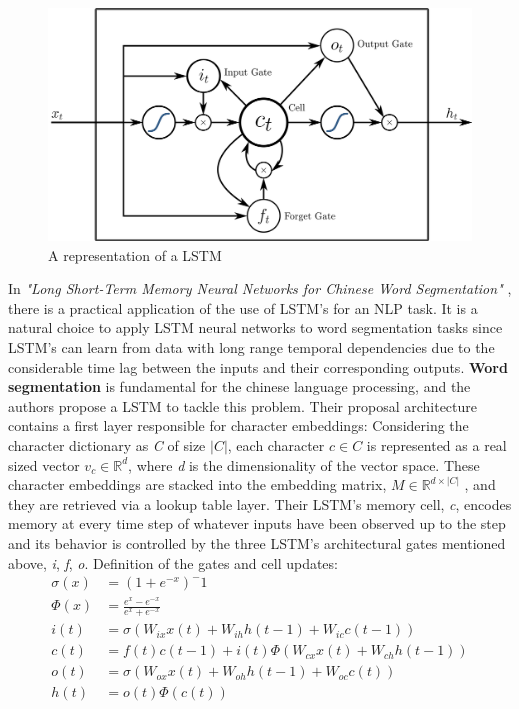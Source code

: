 \documentclass{scrartcl}
\begin{document}
    \begin{figure}[h!]
        \centering
        \includegraphics[scale=0.2]{lstmnn.png}
        \caption{A representation of a LSTM}
    \end{figure}
    In \textit{"Long Short-Term Memory Neural Networks for Chinese Word Segmentation"} 
    \cite{chen-etal-2015-long}, there is a practical application of the use of 
    LSTM's for an NLP task. It is a natural choice to apply LSTM neural networks 
    to word segmentation tasks since LSTM's can learn from data with long range temporal 
    dependencies due to the considerable time lag between the inputs and their 
    corresponding outputs.
    \textbf{Word segmentation} is fundamental for the chinese language processing, and the authors
    propose a LSTM to tackle this problem.
    Their proposal architecture contains a first layer responsible for character embeddings:
    Considering the character dictionary as \textit{C} of size $|C|$, each character
    $c \in C$ is represented as a real sized vector $v_c \in \mathbb{R}^d$, where \textit{d}
    is the dimensionality of the vector space. These character embeddings are stacked into 
    the embedding matrix, $M \in \mathbb{R}^{d \times |C|}$ , and they are retrieved via a 
    lookup table layer. 
    \newpage
    Their LSTM's memory cell, \textit{c}, encodes memory at every time step of whatever inputs
    have been observed up to the step and its behavior is controlled by the three LSTM's 
    architectural gates mentioned above, \textit{i}, \textit{f}, \textit{o}.
    Definition of the gates and cell updates:
    \begin{align*}
        \sigma(x) &= (1 + e^{-x})^-1 \\
        \Phi(x) &= \frac{e^x - e^{-x}}{e^x + e^{-x}} \\
        i(t) &= \sigma(W_{ix}x(t) + W_{ih}h(t-1) + W_{ic}c(t-1)) \\
        c(t) &= f(t)c(t-1) + i(t)\Phi(W_{cx}x(t) + W_{ch}h(t-1)) \\
        o(t) &= \sigma(W_{ox}x(t) + W_{oh}h(t-1) + W_{oc}c(t)) \\
        h(t) &= o(t)\Phi(c(t))
    \end{align*}
\end{document}

